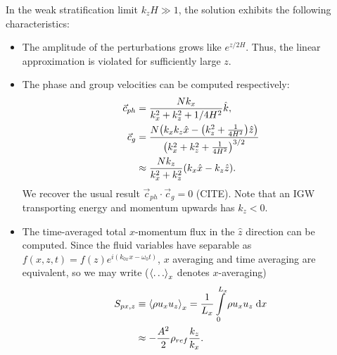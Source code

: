 \documentclass[twocolumn,
        nofootinbib,
        usenames, %
        dvipsnames %
    ]{revtex4-1}%
\DeclarePairedDelimiter\ev{\langle}{\rangle}
\DeclarePairedDelimiter\p{\lparen}{\rparen}
\begin{document}
In the weak stratification limit $k_zH \gg 1$, the solution exhibits the
following characteristics:
\begin{itemize}
    \item The amplitude of the perturbations grows like $e^{z/2H}$. Thus, the
        linear approximation is violated for sufficiently large $z$.

    \item The phase and group velocities can be computed respectively:
        \begin{align}
            \vec{c}_{ph} &= \frac{Nk_x}{k_x^2 + k_z^2 + 1/4H^2} \hat{k},\\
            \vec{c}_{g} &= \frac{N\p*{k_xk_z\hat{x}
                - \p*{k_z^2 + \frac{1}{4H^2}}\hat{z}}}
                {\p*{k_x^2 + k_z^2 + \frac{1}{4H^2}}^{3/2}} \nonumber\\
                &\approx \frac{Nk_z}{k_x^2 + k_z^2}\p*{k_x\hat{x} - k_z\hat{z}}.
        \end{align}
        We recover the usual result $\vec{c}_{ph} \cdot \vec{c}_g = 0$ (CITE).
        Note that an IGW transporting energy and momentum upwards has $k_z < 0$.


    \item The time-averaged total $x$-momentum flux in the $\hat{z}$ direction
        can be computed. Since the fluid variables have separable as $f(x, z, t)
        = f(z)e^{i(k_{0x}x - \omega_0 t)}$, $x$ averaging and time averaging are
        equivalent, so we may write ($\ev*{\dots}_x$ denotes $x$-averaging)
        \begin{align}
            S_{px, z} &\equiv \ev*{\rho u_x u_z}_x =
                \frac{1}{L_x}\int_0^{L_x}\limits \rho u_x u_z\;\mathrm{d}x
                    \nonumber\\
                &\approx -\frac{A^2}{2}\rho_{ref}\frac{k_z}{k_x}.
                    \label{eq:fpx_lin}
        \end{align}


\end{itemize}
\end{document}
